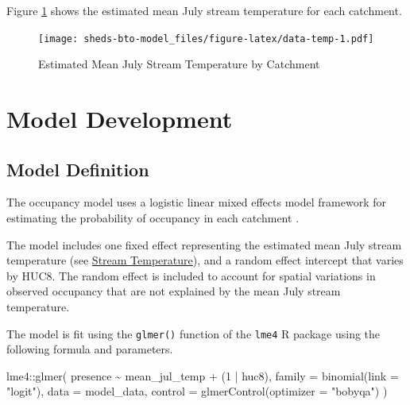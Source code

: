 \documentclass[
]{book}
\newenvironment{Shaded}{\begin{snugshade}}{\end{snugshade}}
\newcommand{\AttributeTok}[1]{\textcolor[rgb]{0.77,0.63,0.00}{#1}}
\newcommand{\DecValTok}[1]{\textcolor[rgb]{0.00,0.00,0.81}{#1}}
\newcommand{\FunctionTok}[1]{\textcolor[rgb]{0.00,0.00,0.00}{#1}}
\newcommand{\NormalTok}[1]{#1}
\newcommand{\SpecialCharTok}[1]{\textcolor[rgb]{0.00,0.00,0.00}{#1}}
\newcommand{\StringTok}[1]{\textcolor[rgb]{0.31,0.60,0.02}{#1}}
\begin{document}
Figure \ref{fig:data-temp} shows the estimated mean July stream temperature for each catchment.

\begin{figure}
\centering
\texttt{[image: sheds-bto-model\_files/figure-latex/data-temp-1.pdf]}
\caption{\label{fig:data-temp}Estimated Mean July Stream Temperature by Catchment}
\end{figure}

\hypertarget{model-development}{%
\chapter{Model Development}\label{model-development}}

\hypertarget{model-definition}{%
\section{Model Definition}\label{model-definition}}

The occupancy model uses a logistic linear mixed effects model framework for estimating the probability of occupancy in each catchment \citep{bolker2009, zuur2009}.

The model includes one fixed effect representing the estimated mean July stream temperature (see \protect\hyperlink{stream-temperature}{Stream Temperature}), and a random effect intercept that varies by HUC8. The random effect is included to account for spatial variations in observed occupancy that are not explained by the mean July stream temperature.

The model is fit using the \texttt{glmer()} function of the \texttt{lme4} R package \citep{bates2015} using the following formula and parameters.

\begin{Shaded}
\begin{Highlighting}[]
\NormalTok{lme4}\SpecialCharTok{::}\FunctionTok{glmer}\NormalTok{(}
\NormalTok{  presence }\SpecialCharTok{\textasciitilde{}}\NormalTok{ mean\_jul\_temp }\SpecialCharTok{+}\NormalTok{ (}\DecValTok{1} \SpecialCharTok{|}\NormalTok{ huc8),}
  \AttributeTok{family =} \FunctionTok{binomial}\NormalTok{(}\AttributeTok{link =} \StringTok{"logit"}\NormalTok{),}
  \AttributeTok{data =}\NormalTok{ model\_data,}
  \AttributeTok{control =} \FunctionTok{glmerControl}\NormalTok{(}\AttributeTok{optimizer =} \StringTok{"bobyqa"}\NormalTok{)}
\NormalTok{)}
\end{Highlighting}
\end{Shaded}
\end{document}

